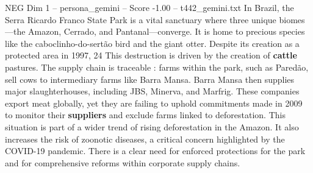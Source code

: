 \begin{textsample}{NEG Dim 1 – persona\_gemini – Score -1.00 – t442\_gemini.txt}  \label{ex:f1_neg_010}
In Brazil, the Serra Ricardo Franco State Park is a vital sanctuary where three unique biomes—the Amazon, Cerrado, and Pantanal—converge.
It is home to precious species like the caboclinho-do-sertão bird and the giant otter.
Despite its creation as a protected area in 1997, 24 %
This destruction is driven by the creation of \textbf{cattle} pastures.
The supply chain is traceable : farms within the park, such as Paredão, sell cows to intermediary farms like Barra Mansa.
Barra Mansa then supplies major slaughterhouses, including JBS, Minerva, and Marfrig.
These companies export meat globally, yet they are failing to uphold commitments made in 2009 to monitor their \textbf{suppliers} and exclude farms linked to deforestation.
This situation is part of a wider trend of rising deforestation in the Amazon.
It also increases the risk of zoonotic diseases, a critical concern highlighted by the COVID-19 pandemic.
There is a clear need for enforced protections for the park and for comprehensive reforms within corporate supply chains.

\end{textsample}
